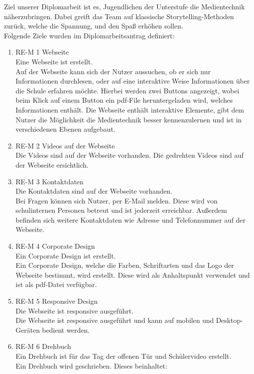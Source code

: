 \documentclass[
    headings=optiontotocandhead,%
    twoside,
    numbers=noenddot,%
    toc=flat, %
    12pt, %
    titlepage, %
    parskip=full, %
    listof=totoc, %
    listof=flat, %
    numbers=noenddot, %
    bibliography=totoc, %
    a4paper,DIV=14,
    BCOR=15mm,
]{scrbook}
\begin{document}
Ziel unserer Diplomarbeit ist es, Jugendlichen der Unterstufe die Medientechnik näherzubringen. Dabei greift das Team auf klassische Storytelling-Methoden zurück, welche die Spannung, und den Spaß erhöhen sollen.\\ Folgende Ziele wurden im Diplomarbeitsantrag definiert:
\begin{enumerate}
\item RE-M 1 Webseite\\
Eine Webseite ist erstellt.\\
Auf der Webseite kann sich der Nutzer aussuchen, ob er sich nur Informationen durchlesen, oder auf eine interaktive Weise Informationen über die Schule erfahren möchte. Hierbei werden zwei Buttons angezeigt, wobei beim Klick auf einem Button ein pdf-File heruntergeladen wird, welches Informationen enthält. Die Webseite enthält interaktive Elemente, gibt dem Nutzer die Möglichkeit die Medientechnik besser kennenzulernen und ist in verschiedenen Ebenen aufgebaut.
\item RE-M 2 Videos auf der Webseite\\
Die Videos sind auf der Webseite vorhanden.
Die gedrehten Videos sind auf der Webseite ersichtlich.
\item RE-M 3 Kontaktdaten\\
Die Kontaktdaten sind auf der Webseite vorhanden.\\
Bei Fragen können sich Nutzer, per E-Mail melden. Diese wird von schulinternen Personen betreut und ist jederzeit erreichbar. Außerdem befinden sich weitere Kontaktdaten wie Adresse und Telefonnummer auf der Webseite.
\item RE-M 4 Corporate Design\\
Ein Corporate Design ist erstellt.\\
Ein Corporate Design, welche die Farben, Schriftarten und das Logo der Webseite bestimmt, wird erstellt. Diese wird als Anhaltspunkt verwendet und ist als pdf-Datei verfügbar.
\item RE-M 5 Responsive Design\\
Die Webseite ist responsive ausgeführt.\\
Die Webseite ist responsive ausgeführt und kann auf mobilen und Desktop-Geräten bedient werden. 
\item RE-M 6 Drehbuch\\
Ein Drehbuch ist für das Tag der offenen Tür und Schülervideo erstellt.\\
Ein Drehbuch wird geschrieben. Dieses beinhaltet:\\

\end{enumerate}
\end{document}
